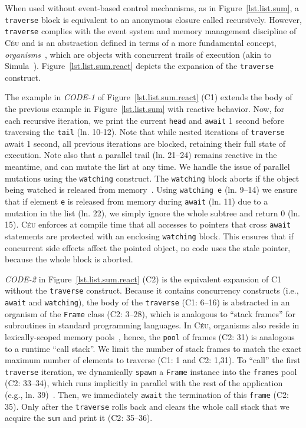 \documentclass{sig-alternate}
\newcommand{\CEU}{\textsc{C\'{e}u}\xspace}
\newcommand{\code}[1] {{\small{\texttt{#1}}}}
\newcommand{\MM}[1] {\textcircled{\tiny{\textsf{#1}}}}
\begin{document}
When used without event-based control mechanisms, as in 
Figure~\ref{lst.list.sum}, a \code{traverse} block is equivalent to an 
anonymous closure called recursively.
%
However, \code{traverse} complies with the event system and memory management 
discipline of \CEU and is an abstraction defined in terms of a more fundamental 
concept, \emph{organisms}~\cite{ceu.mod15}, which are objects with concurrent 
trails of execution (akin to Simula~\cite{simula}).
%
Figure~\ref{lst.list.sum.react} depicts the expansion of the \code{traverse} 
construct.

The example in \emph{CODE-1} of Figure~\ref{lst.list.sum.react} (\MM{C1}) 
extends the body of the previous example in Figure~\ref{lst.list.sum} with 
reactive behavior.
%
Now, for each recursive iteration, we print the current \code{head} 
and \code{await} 1 second before traversing the \code{tail} (ln. 10-12).
%
Note that while nested iterations of \code{traverse} await 1 second, all 
previous iterations are blocked, retaining their full state of execution.
%
Note also that a parallel trail (ln. 21--24) remains reactive in the 
meantime, and can mutate the list at any time.
%
We handle the issue of parallel mutations using the \code{watching} construct.
The \code{watching} block aborts if the object being watched
is released from memory~\cite{ceu.mod15}.
%
Using \code{watching e} (ln. 9--14) we ensure that if element \code{e}
is released from memory during \code{await} (ln. 11) due to a 
mutation in the list (ln. 22), we simply ignore the whole subtree and return 0 
(ln. 15).
%
\CEU enforces at compile time that all accesses to pointers that cross 
\code{await} statements are protected with an enclosing \code{watching} block.
%
This ensures that if concurrent side effects affect the pointed object, no code 
uses the stale pointer, because the whole block is aborted.

\emph{CODE-2} in Figure~\ref{lst.list.sum.react} (\MM{C2}) is the equivalent 
expansion of \MM{C1} without the \code{traverse} construct.
%
Because it contains concurrency constructs (i.e., \code{await} and 
\code{watching}), the body of the \code{traverse} (\MM{C1}: 6--16) is 
abstracted in an organism of the \code{Frame} class (\MM{C2}: 3--28), which is 
analogous to ``stack frames'' for subroutines in standard programming 
languages.
%
In \CEU, organisms also reside in lexically-scoped memory 
pools~\cite{ceu.mod15}, hence, the \code{pool} of frames (\MM{C2}: 31) is 
analogous to a runtime ``call stack''.
We limit the number of stack frames to match the exact maximum number of 
elements to traverse (\MM{C1}: 1 and \MM{C2}: 1,31).
%
To ``call'' the first \code{traverse} iteration, we dynamically \code{spawn} a 
\code{Frame} instance into the \code{frames} pool (\MM{C2}: 33--34), which runs 
implicitly in parallel with the rest of the application (e.g., ln.  
39)~\cite{ceu.mod15}.
Then, we immediately \code{await} the termination of this \code{frame} 
(\MM{C2}: 35).
Only after the \code{traverse} rolls back and clears the whole call stack
that we acquire the \code{sum} and print it (\MM{C2}: 35--36).
\end{document}
